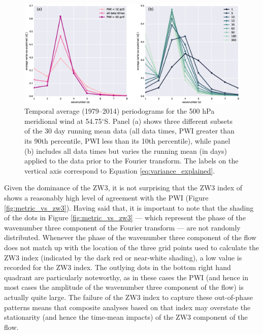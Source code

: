 \begin{figure}
\begin{center}
\includegraphics[width=1\columnwidth]{figures/zonalwaves/va-r2spectrum_ERAInterim_500hPa_daily_native-55S.eps}
\caption[Temporal average (1979--2014) periodograms for the 500 hPa meridional wind at 54.75$^{\circ}$S]{\label{fig:periodograms}
Temporal average (1979--2014) periodograms for the 500 hPa meridional wind at 54.75$^{\circ}$S. Panel (a) shows three different subsets of the 30 day running mean data (all data times, PWI greater than its 90th percentile, PWI less than its 10th percentile), while panel (b) includes all data times but varies the running mean (in days) applied to the data prior to the Fourier transform. The labels on the vertical axis correspond to Equation \ref{eq:variance_explained}.}
\end{center}
\end{figure}


Given the dominance of the ZW3, it is not surprising that the ZW3 index of \citet{Raphael2004} shows a reasonably high level of agreement with the PWI (Figure \ref{fig:metric_vs_zw3}). Having said that, it is important to note that the shading of the dots in Figure \ref{fig:metric_vs_zw3} --- which represent the phase of the wavenumber three component of the Fourier transform --- are not randomly distributed. Whenever the phase of the wavenumber three component of the flow does not match up with the location of the three grid points used to calculate the ZW3 index (indicated by the dark red or near-white shading), a low value is recorded for the ZW3 index. The outlying dots in the bottom right hand quadrant are particularly noteworthy, as in these cases the PWI (and hence in most cases the amplitude of the wavenumber three component of the flow) is actually quite large. The failure of the ZW3 index to capture these out-of-phase patterns means that composite analyses based on that index may overstate the stationarity (and hence the time-mean impacts) of the ZW3 component of the flow.

